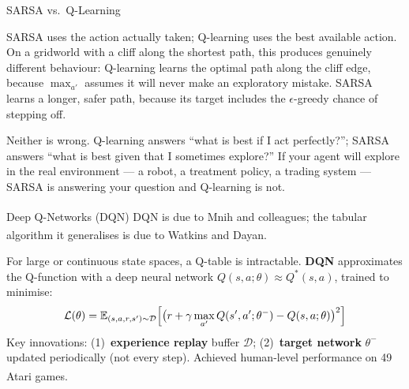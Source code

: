 \begin{v3topic}{SARSA vs.\ Q-Learning}
\begin{cautionbox}
SARSA uses the action actually taken; Q-learning uses the best available
action. On a gridworld with a cliff along the shortest path, this produces
genuinely different behaviour: Q-learning learns the optimal path along the
cliff edge, because $\max_{a'}$ assumes it will never make an exploratory
mistake. SARSA learns a longer, safer path, because its target includes the
$\epsilon$-greedy chance of stepping off.

Neither is wrong. Q-learning answers ``what is best if I act perfectly?'';
SARSA answers ``what is best given that I sometimes explore?'' If your agent
will explore in the real environment --- a robot, a treatment policy, a trading
system --- SARSA is answering your question and Q-learning is not.
\end{cautionbox}

\end{v3topic}
\begin{v3topic}{Deep Q-Networks (DQN)}
        DQN is due to Mnih and
        colleagues\textsuperscript{\cite{mnihHumanlevelControlDeep2015}}; the
        tabular algorithm it generalises is due to Watkins and
        Dayan\textsuperscript{\cite{watkinsQlearning1992}}.

        For large or continuous state spaces, a Q-table is intractable.
        \textbf{DQN} approximates the Q-function with a deep neural network
        $Q(s,a;\theta) \approx Q^*(s,a)$, trained to minimise:
        \begin{equation}
            \mathcal{L}(\theta) = \mathbb{E}_{(s,a,r,s') \sim \mathcal{D}}
            \Bigl[\bigl(r + \gamma \max_{a'} Q(s',a';\theta^-) - Q(s,a;\theta)\bigr)^2\Bigr]
        \end{equation}
        Key innovations: (1)~\textbf{experience replay} buffer $\mathcal{D}$;
        (2)~\textbf{target network} $\theta^-$ updated periodically (not every
        step). Achieved human-level performance on 49 Atari
        games.\textsuperscript{\cite[][p.~350]{hurbansGrokkingArtificialIntelligence2020}}

\end{v3topic}
